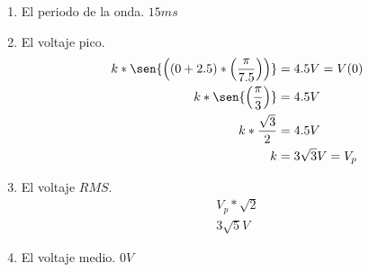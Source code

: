 \documentclass[../main.tex]{subfiles}
\begin{document}
\begin{enumerate}[label=\alph*)]
	\item El periodo de la onda.
		\subitem $15ms$
	\item El voltaje pico.
		\begin{align*}
			k*\sen
			{
				\left(
					(0+2.5)*
					\left(
						\frac{\pi}{7.5}
					\right)
				\right)
			} &= 4.5V = V(0)\\
			k*\sen
			{
				\left(
					\frac{\pi}{3}
				\right)
			} &= 4.5V\\
			k* \frac{\sqrt{3}}{2}  &= 4.5V\\
			k &= 3\sqrt{3}V = V_p
		\end{align*}
	\item El voltaje $RMS$.
		\begin{align*}
			V_p * \sqrt{2}\\
			3\sqrt{5}V
		\end{align*}
	\item El voltaje medio.
		\subitem $0V$
\end{enumerate}
\end{document}
